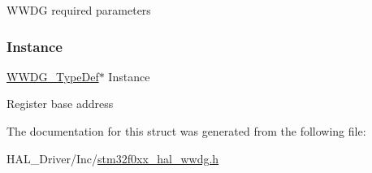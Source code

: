 W\+W\+DG required parameters \mbox{\label{struct_w_w_d_g___handle_type_def_adaefc2f8b1848fb56b27cb8e2ff17eec}} 
\subsubsection{\texorpdfstring{Instance}{Instance}}
{\footnotesize\ttfamily \hyperlink{struct_w_w_d_g___type_def}{W\+W\+D\+G\+\_\+\+Type\+Def}$\ast$ Instance}

Register base address 

The documentation for this struct was generated from the following file\+:\begin{DoxyCompactItemize}
\item 
H\+A\+L\+\_\+\+Driver/\+Inc/\hyperlink{stm32f0xx__hal__wwdg_8h}{stm32f0xx\+\_\+hal\+\_\+wwdg.\+h}\end{DoxyCompactItemize}
